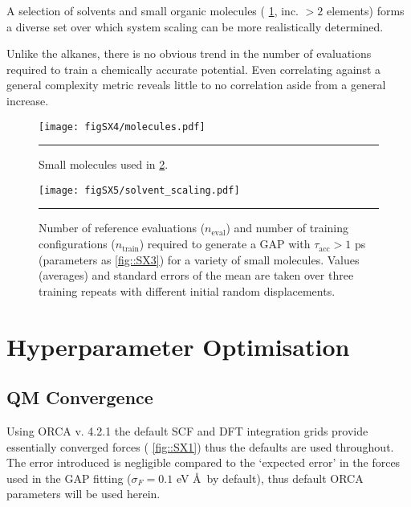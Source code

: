\documentclass[11pt]{article}
\numberwithin{equation}{subsection}
\newcommand{\tacc}{$\tau_\text{acc}$}
\begin{document}
A selection of solvents and small organic molecules (\figurename{ \ref{fig::SX4}}, inc. $>2$ elements) forms a diverse set over which system scaling can be more realistically determined. 

Unlike the alkanes, there is no obvious trend in the number of evaluations required to train a chemically accurate potential. Even correlating against a general complexity metric\cite{Bertz1981} reveals little to no correlation aside from a general increase.

\begin{figure}[h!]
	\centering
	\vspace{0.4cm}
	\texttt{[image: figSX4/molecules.pdf]}
	\vspace{0.2cm}
	\hrule
	\vspace{0.1cm}
	\caption{Small molecules used in \figurename{ \ref{fig::SX5}}.}
	\label{fig::SX4}
\end{figure}


\begin{figure}[h!]
	\centering
	\vspace{0.4cm}
	\texttt{[image: figSX5/solvent\_scaling.pdf]}
	\hrule
	\vspace{0.1cm}
	\caption{Number of reference evaluations ($n_\text{eval}$) and number of training configurations ($n_\text{train}$) required to generate a GAP with \tacc $>1$ ps (parameters as \figurename{ \ref{fig::SX3}}) for a variety of small molecules. Values (averages) and standard errors of the mean are taken over three training repeats with different initial random displacements.}
	\label{fig::SX5}
\end{figure}



\clearpage
\section{Hyperparameter Optimisation}
\label{section::hyperparam_opt}

\subsection{QM Convergence}


Using ORCA v. 4.2.1 the default SCF and DFT integration grids provide essentially converged forces (\figurename{ \ref{fig::SX1}}) thus the defaults are used throughout. The error introduced is negligible compared to the `expected error' in the forces used in the GAP fitting ($\sigma_F = 0.1$ eV \AA~by default), thus default ORCA parameters will be used herein.
\end{document}
